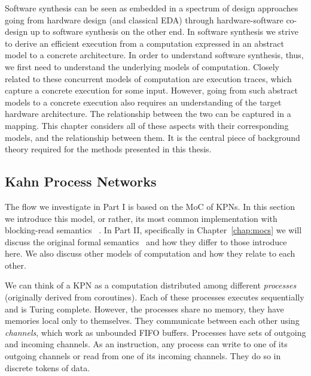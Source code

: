 Software synthesis can be seen as embedded in a spectrum of design approaches going from hardware design (and classical \ac{EDA}) through hardware-software co-design up to software synthesis on the other end. 
In software synthesis we strive to derive an efficient execution from a computation expressed in an abstract model to a concrete architecture.
In order to understand software synthesis, thus, we first need to understand the underlying models of computation.
Closely related to these concurrent models of computation are execution traces, which capture a concrete execution for some input.
However, going from such abstract models to a concrete execution also requires an understanding of the target hardware architecture.
The relationship between the two can be captured in a mapping.
This chapter considers all of these aspects with their corresponding models, and the relationship between them.
It is the central piece of background theory required for the methods presented in this thesis.

\subsection{Kahn Process Networks}

The flow we investigate in Part I is based on the \ac{MoC} of \acfp{KPN}.
In this section we introduce this model, or rather, its most common implementation with blocking-read semantics~\cite{kahn_macqueen} .
In Part II, specifically in Chapter~\ref{chap:mocs} we will discuss the original formal semantics~\cite{kahn74} and how they differ to those introduce here.
We also discuss other models of computation and how they relate to each other.

We can think of a \ac{KPN} as a computation distributed among different \emph{processes} (originally derived from coroutines).
Each of these processes executes sequentially and is Turing complete. However, the processes share no memory, they have memories local only to themselves.
They communicate between each other using \emph{channels}, which work as unbounded \acs{FIFO} buffers. 
Processes have sets of outgoing and incoming channels.
As an instruction, any process can write to one of its outgoing channels or read from one of its incoming channels.
They do so in discrete tokens of data.

